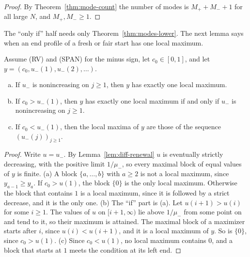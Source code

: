 \begin{proof}
By Theorem~\ref{thm:mode-count} the number of modes is $M_\plus+M_\minus+1$ for all large $N$,
and $M_\plus,M_\minus\ge1$.
\end{proof}

The ``only if'' half needs only Theorem~\ref{thm:modes-lower}. The next lemma says when an end
profile of a fresh or fair start has one local maximum.

\begin{lemma}\label{lem:one-max}
Assume (RV) and (SPAN) for the minus sign, let $c_0\in[0,1]$, and let
$y=(c_0,u_\minus(1),u_\minus(2),\dots)$.
\begin{enumerate}[(a)]
\item If $u_\minus$ is nonincreasing on $j\ge1$, then $y$ has exactly one local maximum.
\item If $c_0>u_\minus(1)$, then $y$ has exactly one local maximum if and only if $u_\minus$
is nonincreasing on $j\ge1$.
\item If $c_0<u_\minus(1)$, then the local maxima of $y$ are those of the sequence
$(u_\minus(j))_{j\ge1}$.
\end{enumerate}
\end{lemma}

\begin{proof}
Write $u=u_\minus$. By Lemma~\ref{lem:diff-renewal} $u$ is eventually strictly decreasing, with
the positive limit $1/\mu_\minus$, so every maximal block of equal values of $y$ is finite.
(a) A block $\{a,\dots,b\}$ with $a\ge2$ is not a local maximum, since $y_{a-1}\ge y_a$. If
$c_0>u(1)$, the block $\{0\}$ is the only local maximum. Otherwise the block that contains $1$
is a local maximum, since it is followed by a strict decrease, and it is the only one. (b) The
``if'' part is (a). Let $u(i+1)>u(i)$ for some $i\ge1$. The values of $u$ on $[i+1,\infty)$ lie
above $1/\mu_\minus$ from some point on and tend to it, so their maximum is attained. The
maximal block of a maximizer starts after $i$, since $u(i)<u(i+1)$, and it is a local maximum
of $y$. So is $\{0\}$, since $c_0>u(1)$. (c) Since $c_0<u(1)$, no local maximum contains $0$,
and a block that starts at $1$ meets the condition at its left end.
\end{proof}

